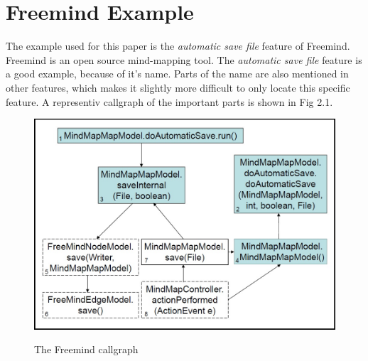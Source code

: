 \chapter{Freemind Example}
\label{ch:Freemind Example}

The example used for this paper is the \textit{automatic save file} feature of Freemind. Freemind is an open source  mind-mapping tool. The \textit{automatic save file} feature is a good example, because of it's name. Parts of the name are also mentioned in other features, which makes it slightly more difficult to only locate this specific feature.
A representiv callgraph of the important parts is shown in Fig 2.1.

\begin{figure}
  \centering
  \includegraphics[width=\linewidth]{src/pic/freemind_callgraph}
  \label{dia:freemind callgraph}
  \caption{The Freemind callgraph \cite{FrM16} \cite{rubin2013survey}}
\end{figure}

